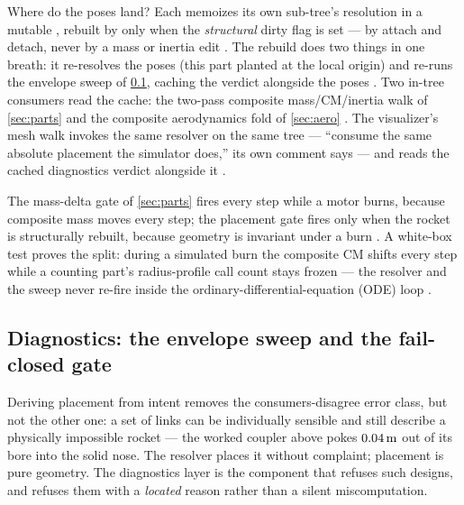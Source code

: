 Where do the poses land? Each  memoizes its own sub-tree's resolution in a
mutable , rebuilt by  only when the
\emph{structural} dirty flag  is set --- by attach and detach, never
by a mass or inertia edit . The rebuild does two things in
one breath: it re-resolves the poses (this part planted at the local origin) and re-runs
the envelope sweep of \cref{sec:placement-diagnostics}, caching the verdict alongside the
poses . Two in-tree consumers read the cache: the two-pass
composite mass/CM/inertia walk of \cref{sec:parts}  and
the composite aerodynamics fold of \cref{sec:aero} . The
visualizer's mesh walk invokes the same resolver on the same tree --- ``consume the same
absolute placement the simulator does,'' its own comment says --- and reads the cached
diagnostics verdict alongside it .

\begin{keyinsight}
The mass-delta gate of \cref{sec:parts} fires every step while a motor burns, because
composite mass moves every step; the placement gate fires only when the rocket is
structurally rebuilt, because geometry is invariant under a burn
. A white-box test proves the split: during a simulated
burn the composite CM shifts every step while a counting part's radius-profile call
count stays frozen --- the resolver and the sweep never re-fire inside the
ordinary-differential-equation (ODE) loop .
\end{keyinsight}

\subsection{Diagnostics: the envelope sweep and the fail-closed gate}\label{sec:placement-diagnostics}

Deriving placement from intent removes the consumers-disagree error class, but not the
other one: a set of links can be individually sensible and still describe a physically
impossible rocket --- the worked coupler above pokes $0.04\,\mathrm{m}$ out of its bore into the
solid nose. The resolver places it without complaint; placement is pure geometry. The
diagnostics layer is the component that refuses such designs, and refuses them with a
\emph{located} reason rather than a silent miscomputation.

